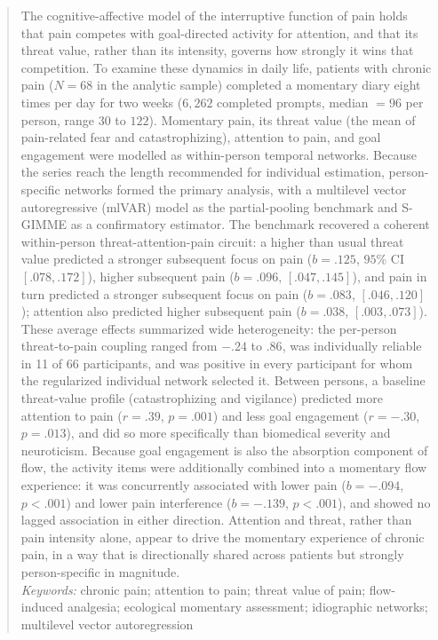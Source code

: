 \documentclass[11pt,a4paper]{article}
\begin{document}
\begin{titlepage}
\begin{abstract}
\noindent
The cognitive-affective model of the interruptive function of pain holds that pain competes with
goal-directed activity for attention, and that its threat value, rather than its intensity, governs
how strongly it wins that competition. To examine these dynamics in daily life,
patients with chronic pain ($N=68$ in the analytic sample) completed a momentary diary eight
times per day for two weeks ($6{,}262$ completed prompts,
median $=96$ per person, range $30$ to $122$). Momentary pain, its threat value (the mean of
pain-related fear and catastrophizing), attention to pain, and goal engagement were modelled as
within-person temporal networks. Because the series reach the length recommended for individual
estimation, person-specific networks formed the primary analysis, with a multilevel vector
autoregressive (mlVAR) model as the partial-pooling benchmark and S-GIMME as a confirmatory
estimator. The
benchmark recovered a coherent within-person threat-attention-pain circuit: a higher than usual
threat value predicted a stronger subsequent focus on pain ($b=.125$, $95\%$ CI $[.078, .172]$),
higher subsequent pain ($b=.096$, $[.047, .145]$), and pain in turn predicted a stronger
subsequent focus on pain ($b=.083$, $[.046, .120]$); attention also predicted higher subsequent
pain ($b=.038$, $[.003, .073]$). These average effects summarized wide heterogeneity: the
per-person threat-to-pain coupling ranged from $-.24$ to $.86$, was individually reliable in 11
of 66 participants, and was positive in every participant for whom the regularized individual
network selected it. Between persons, a baseline threat-value profile (catastrophizing and
vigilance) predicted more attention to pain
($r=.39$, $p=.001$) and less goal engagement ($r=-.30$, $p=.013$), and did so more specifically
than biomedical severity and neuroticism. Because goal engagement is also the absorption
component of flow, the activity items were additionally combined into a momentary flow
experience: it was concurrently associated with lower pain ($b=-.094$, $p<.001$) and lower pain
interference ($b=-.139$, $p<.001$), and showed no lagged association in either direction. Attention and threat, rather than pain intensity
alone, appear to drive the momentary experience of chronic pain, in a way that is directionally
shared across patients but strongly person-specific in magnitude.\\[0.5em]
\noindent\textit{Keywords:} chronic pain; attention to pain; threat value of pain; flow-induced analgesia;
ecological momentary assessment; idiographic networks; multilevel vector autoregression
\end{abstract}

\vspace*{\fill}
\end{titlepage}
\setcounter{page}{2}
\end{document}
